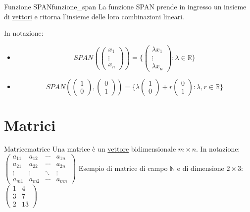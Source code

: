 \documentclass{article}
\begin{document}
\begin{definition}{Funzione SPAN}{funzione_span}
    La funzione SPAN prende in ingresso un insieme di \hyperlink{def:vettore}{vettori} e ritorna l'insieme delle loro combinazioni lineari.
    
    In notazione: \begin{itemize}
        \item \[SPAN(\begin{pmatrix}
            x_1 \\
            \vdots \\
            x_n
            \end{pmatrix}) = \{\begin{pmatrix}
            \lambda x_1 \\
            \vdots \\
            \lambda x_n
            \end{pmatrix} : \lambda \in \mathbb{R}\}\]
        \item \[SPAN(\begin{pmatrix}
            1 \\
            0
            \end{pmatrix}, \begin{pmatrix}
            0 \\
            1
            \end{pmatrix}) = \{ \lambda\begin{pmatrix}
            1 \\
            0
            \end{pmatrix} + r\begin{pmatrix}
            0 \\
            1
            \end{pmatrix} : \lambda, r \in \mathbb{R}\}\]
    \end{itemize}
\end{definition}

\section{Matrici}

\begin{definition}{Matrice}{matrice}
    Una matrice è un \hyperlink{def:vettore}{vettore} bidimensionale $m \times n$. In notazione: $\begin{pmatrix}
    a_{11} & a_{12} & \cdots & a_{1n} \\
    a_{21} & a_{22} & \cdots & a_{2n} \\
    \vdots & \vdots & \ddots & \vdots \\
    a_{m1} & a_{m2} & \cdots & a_{mn}
    \end{pmatrix}$ Esempio di matrice di campo $\mathbb{N}$ e di dimensione $2 \times 3$: $\begin{pmatrix}
    1 & 4 \\
    3 & 7 \\
    2 & 13
    \end{pmatrix}$
\end{definition}
\end{document}
